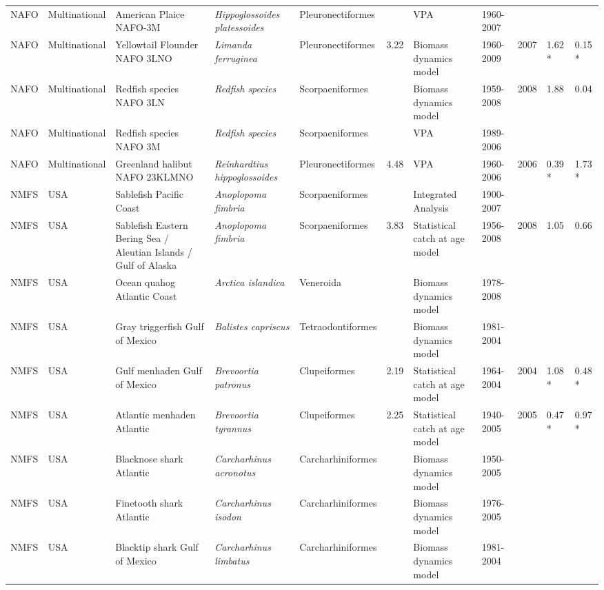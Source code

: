 \begin{longtable}{p{1.5cm}p{1.5cm}p{3cm}p{3cm}p{2.5cm}p{0.9cm}p{1.4cm}p{0.9cm}p{0.9cm}p{0.9cm}p{1cm}}
  NAFO & Multinational & American Plaice NAFO-3M & \textit{Hippoglossoides platessoides} & Pleuronectiformes &  & VPA & 1960-2007 &  &  &  \\ 
  NAFO & Multinational & Yellowtail Flounder NAFO 3LNO & \textit{Limanda ferruginea} & Pleuronectiformes & 3.22 & Biomass dynamics model & 1960-2009 & 2007 & 1.62 * & 0.15 * \\ 
  NAFO & Multinational & Redfish species NAFO 3LN & \textit{Redfish species} & Scorpaeniformes &  & Biomass dynamics model & 1959-2008 & 2008 & 1.88 & 0.04 \\ 
  NAFO & Multinational & Redfish species NAFO 3M & \textit{Redfish species} & Scorpaeniformes &  & VPA & 1989-2006 &  &  &  \\ 
  NAFO & Multinational & Greenland halibut NAFO 23KLMNO & \textit{Reinhardtius hippoglossoides} & Pleuronectiformes & 4.48 & VPA & 1960-2006 & 2006 & 0.39 * & 1.73 * \\ 
  NMFS & USA & Sablefish Pacific Coast & \textit{Anoplopoma fimbria} & Scorpaeniformes &  & Integrated Analysis & 1900-2007 &  &  &  \\ 
  NMFS & USA & Sablefish Eastern Bering Sea / Aleutian Islands / Gulf of Alaska & \textit{Anoplopoma fimbria} & Scorpaeniformes & 3.83 & Statistical catch at age model & 1956-2008 & 2008 & 1.05 & 0.66 \\ 
  NMFS & USA & Ocean quahog Atlantic Coast & \textit{Arctica islandica} & Veneroida &  & Biomass dynamics model & 1978-2008 &  &  &  \\ 
  NMFS & USA & Gray triggerfish Gulf of Mexico & \textit{Balistes capriscus} & Tetraodontiformes &  & Biomass dynamics model & 1981-2004 &  &  &  \\ 
  NMFS & USA & Gulf menhaden Gulf of Mexico & \textit{Brevoortia patronus} & Clupeiformes & 2.19 & Statistical catch at age model & 1964-2004 & 2004 & 1.08 * & 0.48 * \\ 
  NMFS & USA & Atlantic menhaden Atlantic & \textit{Brevoortia tyrannus} & Clupeiformes & 2.25 & Statistical catch at age model & 1940-2005 & 2005 & 0.47 * & 0.97 * \\ 
  NMFS & USA & Blacknose shark Atlantic & \textit{Carcharhinus acronotus} & Carcharhiniformes &  & Biomass dynamics model & 1950-2005 &  &  &  \\ 
  NMFS & USA & Finetooth shark Atlantic & \textit{Carcharhinus isodon} & Carcharhiniformes &  & Biomass dynamics model & 1976-2005 &  &  &  \\ 
  NMFS & USA & Blacktip shark Gulf of Mexico & \textit{Carcharhinus limbatus} & Carcharhiniformes &  & Biomass dynamics model & 1981-2004 &  &  &  \\ 

\end{longtable}
